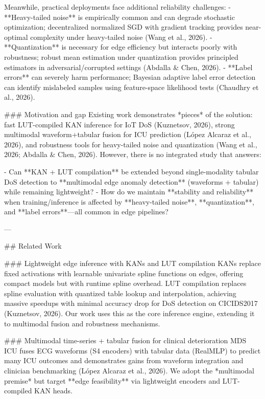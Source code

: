 Meanwhile, practical deployments face additional reliability challenges:  
- **Heavy-tailed noise** is empirically common and can degrade stochastic optimization; decentralized normalized SGD with gradient tracking provides near-optimal complexity under heavy-tailed noise (Wang et al., 2026).  
- **Quantization** is necessary for edge efficiency but interacts poorly with robustness; robust mean estimation under quantization provides principled estimators in adversarial/corrupted settings (Abdalla & Chen, 2026).  
- **Label errors** can severely harm performance; Bayesian adaptive label error detection can identify mislabeled samples using feature-space likelihood tests (Chaudhry et al., 2026).

### Motivation and gap  
Existing work demonstrates *pieces* of the solution: fast LUT-compiled KAN inference for IoT DoS (Kuznetsov, 2026), strong multimodal waveform+tabular fusion for ICU prediction (López Alcaraz et al., 2026), and robustness tools for heavy-tailed noise and quantization (Wang et al., 2026; Abdalla & Chen, 2026). However, there is no integrated study that answers:

- Can **KAN + LUT compilation** be extended beyond single-modality tabular DoS detection to **multimodal edge anomaly detection** (waveforms + tabular) while remaining lightweight?  
- How do we maintain **stability and reliability** when training/inference is affected by **heavy-tailed noise**, **quantization**, and **label errors**—all common in edge pipelines?

---

## Related Work  

### Lightweight edge inference with KANs and LUT compilation  
KANs replace fixed activations with learnable univariate spline functions on edges, offering compact models but with runtime spline overhead. LUT compilation replaces spline evaluation with quantized table lookup and interpolation, achieving massive speedups with minimal accuracy drop for DoS detection on CICIDS2017 (Kuznetsov, 2026). Our work uses this as the core inference engine, extending it to multimodal fusion and robustness mechanisms.

### Multimodal time-series + tabular fusion for clinical deterioration  
MDS ICU fuses ECG waveforms (S4 encoders) with tabular data (RealMLP) to predict many ICU outcomes and demonstrates gains from waveform integration and clinician benchmarking (López Alcaraz et al., 2026). We adopt the *multimodal premise* but target **edge feasibility** via lightweight encoders and LUT-compiled KAN heads.

